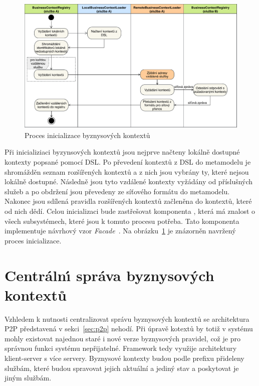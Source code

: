 \begin{figure}
    \centering
    \includegraphics[keepaspectratio=true, width=\linewidth]{figures/business-context-loading.pdf}
    \caption{Proces inicializace byznysov\'ych kontextů}
    \label{fig:business-context-loading}
\end{figure}

Při inicializiaci byzynsových kontextů jsou nejprve načteny lokálně dostupné kontexty popsané pomocí \gls{DSL}.
Po převedení kontextů z \gls{DSL} do metamodelu je shromážděn seznam rozšířených kontextů a z nich jsou vybrány ty,
které nejsou lokálně dostupné. Následně jsou tyto vzdálené kontexty vyžádány od příslušných služeb
a po obdržení jsou převedeny ze síťového formátu do metamodelu. Nakonec jsou sdílená pravidla rozšířených kontextů začleněna
do kontextů, které od nich dědí. Celou inicializaci bude zastřešovat komponenta , která
má znalost o všech subsystémech, které jsou k tomuto procesu potřeba. Tato komponenta implementuje
návrhový vzor \textit{Facade}~\cite{fowler2002patterns}. Na obrázku~\ref{fig:business-context-loading} je znázorněn
navržený proces inicializace.

\section{Centráln\'{\i} správa byznysových kontextů}

Vzhledem k nutnosti centralizovat správu byznysových kontextů se
architektura \gls{P2P} představená v sekci~\ref{sec:p2p} nehodí.
Při úpravě kotextů by totiž v systému mohly existovat najednou staré i nové verze
byznysových pravidel, což je pro správnou funkci systému nepřijatelné.
Framework tedy využije architektury klient-server s více servery.
Byznysové kontexty budou podle prefixu přideleny službám, které budou
spravovat jejich aktuální a jediný stav a poskytovat je jiným službám.

